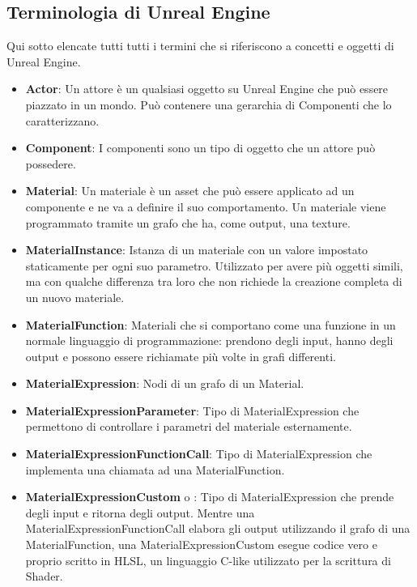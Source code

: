 \documentclass[main.tex]{subfiles}
\begin{document}
\subsection{Terminologia di Unreal Engine}\label{subsec:1_dataStructsUE}
Qui sotto elencate tutti tutti i termini che si riferiscono a concetti e oggetti di Unreal Engine.
\begin{itemize}
    \item \textbf{Actor}: Un attore è un qualsiasi oggetto su Unreal Engine che può essere piazzato in un mondo. Può contenere una gerarchia di Componenti che lo caratterizzano.
    \item \textbf{Component}: I componenti sono un tipo di oggetto che un attore può possedere.
    \item \textbf{Material}: Un materiale è un asset che può essere applicato ad un componente e ne va a definire il suo comportamento. Un materiale viene programmato tramite un grafo che ha, come output, una texture.
    \item \textbf{MaterialInstance}: Istanza di un materiale con un valore impostato staticamente per ogni suo parametro. Utilizzato per avere più oggetti simili, ma con qualche differenza tra loro che non richiede la creazione completa di un nuovo materiale.
    \item \textbf{MaterialFunction}: Materiali che si comportano come una funzione in un normale linguaggio di programmazione: prendono degli input, hanno degli output e possono essere richiamate più volte in grafi differenti.
    \item \textbf{MaterialExpression}: Nodi di un grafo di un Material.
    \item \textbf{MaterialExpressionParameter}: Tipo di MaterialExpression che permettono di controllare i parametri del materiale esternamente.
    \item \textbf{MaterialExpressionFunctionCall}: Tipo di MaterialExpression che implementa una chiamata ad una MaterialFunction.
    \item \textbf{MaterialExpressionCustom} o : Tipo di MaterialExpression che prende degli input e ritorna degli output. Mentre una MaterialExpressionFunctionCall elabora gli output utilizzando il grafo di una MaterialFunction, una MaterialExpressionCustom esegue codice vero e proprio scritto in HLSL, un linguaggio C-like utilizzato per la scrittura di Shader.
\end{itemize}
\end{document}
